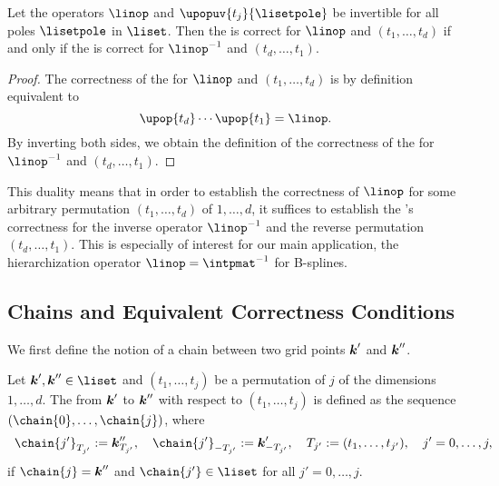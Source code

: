\begin{lemma}
  \label{lemma:dualityUnidirectionalPrinciple}
  Let the operators $\linop$ and $\upopuv{t_j}{\lisetpole}$ be invertible
  for all poles $\lisetpole$ in $\liset$.
  Then the \up is correct for $\linop$ and $(t_1, \dotsc, t_d)$
  if and only if the \up is correct for $\linopinv$ and $(t_d, \dotsc, t_1)$.
\end{lemma}

\begin{proof}
  The correctness of the \up for $\linop$ and $(t_1, \dotsc, t_d)$
  is by definition equivalent to
  \begin{equation}
    \upop{t_d} \dotsm \upop{t_1} = \linop.
  \end{equation}
  By inverting both sides, we obtain the definition of the
  correctness of the \up for $\linopinv$ and $(t_d, \dotsc, t_1)$.
\end{proof}

This duality means that in order to establish the correctness of $\linop$
for some arbitrary permutation $(t_1, \dotsc, t_d)$ of $1, \dotsc, d$,
it suffices to establish the \up's correctness for the
inverse operator $\linopinv$ and the reverse permutation $(t_d, \dotsc, t_1)$.
This is especially of interest for our main application,
the hierarchization operator $\linop = \intpmatinv$ for B-splines.



\subsection{Chains and Equivalent Correctness Conditions}
\label{sec:453chains}

We first define the notion of a chain between two grid points
${\boldsymbol{k}}'$ and ${\boldsymbol{k}}''$.

\begin{definition}[chain]
  \label{def:chain}
  Let $\*k', \*k'' \in \liset$ and
  $(t_1, \dotsc, t_j)$ be a permutation of $j$ of the
  dimensions $1, \dotsc, d$.
  The  from ${\boldsymbol{k}}'$ to ${\boldsymbol{k}}''$ with respect to
  $(t_1, \dotsc, t_j)$ is defined as the sequence
  $(\chain{0}, \dotsc, \chain{j})$, where
  \begin{equation}
    \chain{j'}_{T_{j'}}
    := \*k''_{T_{j'}},\quad
    \chain{j'}_{-T_{j'}}
    := \*k'_{-T_{j'}},\quad
    T_{j'}
    := (t_1, \dotsc, t_{j'}),\quad
    j' = 0, \dotsc, j,
    \hspace*{-10mm}
  \end{equation}
  if $\chain{j} = \*k''$ and
  $\chain{j'} \in \liset$ for all $j' = 0, \dotsc, j$.
\end{definition}


